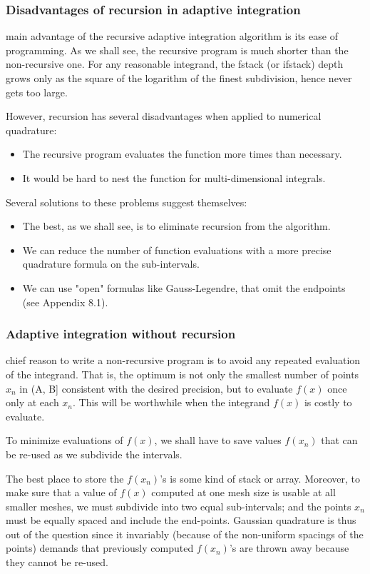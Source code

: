 \subsubsection{Disadvantages of recursion in adaptive integration}
 main advantage of the recursive adaptive integration algorithm is its ease of programming. As we shall see, the recursive program is much shorter than the non-recursive one. For any reasonable integrand, the fstack (or ifstack) depth grows only as the square of the logarithm of the finest subdivision, hence never gets too large.

However, recursion has several disadvantages when applied to numerical quadrature:

\begin{itemize}
    \item The recursive program evaluates the function more times than necessary.
    \item It would be hard to nest the function  for multi-dimensional integrals.
\end{itemize}

Several solutions to these problems suggest themselves:
\begin{itemize}
    \item The best, as we shall see, is to eliminate recursion from the algorithm.
    \item We can reduce the number of function evaluations with a more precise quadrature formula on the sub-intervals.
    \item We can use "open" formulas like Gauss-Legendre, that omit the endpoints (see Appendix 8.1).
\end{itemize}

\subsubsection{Adaptive integration without recursion}
 chief reason to write a non-recursive program is to avoid any repeated evaluation of the integrand. That is, the optimum is not only the smallest number of points $x_n$ in (A, B] consistent with the desired precision, but to evaluate $f(x)$ once only at each $x_n$. This will be worthwhile when the integrand $f(x)$ is costly to evaluate.

To minimize evaluations of $f(x)$, we shall have to save values $f(x_n)$ that can be re-used as we subdivide the intervals.

The best place to store the $f(x_n)$’s is some kind of stack or array. Moreover, to make sure that a value of $f(x)$ computed at one mesh size is usable at all smaller meshes, we must subdivide into two equal sub-intervals; and the points $x_n$ must be equally spaced and include the end-points. Gaussian quadrature is thus out of the question since it invariably (because of the non-uniform spacings of the points) demands that previously computed $f(x_n)$'s are thrown away because they cannot be re-used.

